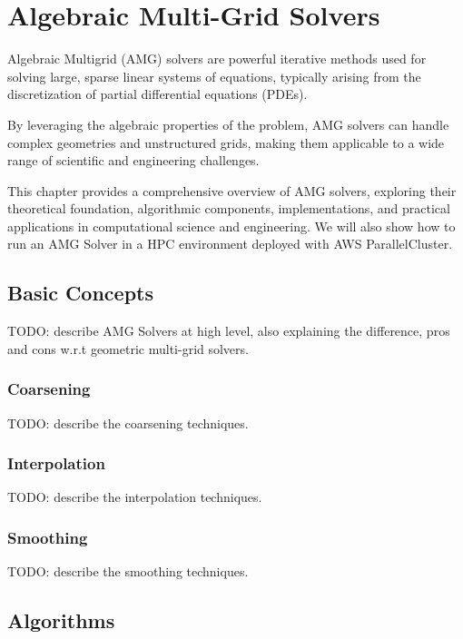 \chapter{Algebraic Multi-Grid Solvers}

Algebraic Multigrid (AMG) solvers are powerful iterative methods used for solving large, sparse linear
systems of equations, typically arising from the discretization of partial differential equations (PDEs).

By leveraging the algebraic properties of the problem, AMG solvers can handle complex geometries and
unstructured grids, making them applicable to a wide range of scientific and engineering challenges.

This chapter provides a comprehensive overview of AMG solvers, exploring their theoretical foundation,
algorithmic components, implementations, and practical applications in computational science and engineering.
We will also show how to run an AMG Solver in a HPC environment deployed with AWS ParallelCluster.

\section{Basic Concepts}
\label{sec:basic-concepts}

TODO: describe AMG Solvers at high level, also explaining the difference, pros and cons w.r.t geometric
multi-grid solvers.

\subsection{Coarsening}
\label{ssec:coarsening}

TODO: describe the coarsening techniques.

\subsection{Interpolation}
\label{ssec:interpolation}

TODO: describe the interpolation techniques.

\subsection{Smoothing}
\label{ssec:smoothing}

TODO: describe the smoothing techniques.

\section{Algorithms}
\label{sec:algorithms}


